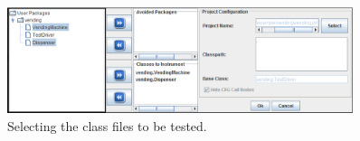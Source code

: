 
\begin{figure}[!ht]
\begin{center}
\includegraphics[width=0.90\textwidth]{fig/project-manager.eps}
\caption{\label{fig:project-manager}Selecting the class files to
be tested.}
\end{center}
\end{figure}
